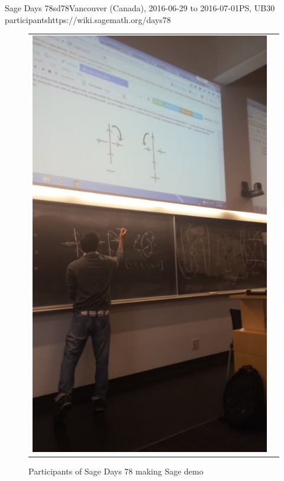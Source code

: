 \begin{event}{Sage Days 78}{sd78}{Vancouver (Canada), 2016-06-29 to 2016-07-01}{PS, UB}{30 participants}{https://wiki.sagemath.org/days78}
\begin{figure}[ht]
\caption*{Participants of Sage Days 78 making Sage demo}
\begin{tabular}{cc}
\includegraphics[scale=0.3]{pictures/sd78-1.jpg}
&

\end{tabular}
\end{figure}
\end{event}
